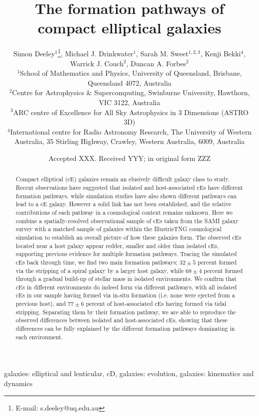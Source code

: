 \documentclass[a4paper,fleqn,usenatbib]{mnras}
\title[cE Formation]{The formation pathways of compact elliptical galaxies }
\author[S. Deeley et al.]{
Simon Deeley$^{1}$\thanks{E-mail: s.deeley@uq.edu.au},
Michael J. Drinkwater$^{1}$, Sarah M. Sweet$^{1,2,3}$, Kenji Bekki$^{4}$, Warrick J. Couch$^{2}$, \newauthor Duncan A. Forbes$^{2}$\\
${}^1$School of Mathematics and Physics, University of Queensland, Brisbane, Queensland 4072, Australia\\
${}^2$Centre for Astrophysics \& Supercomputing, Swinburne University, Hawthorn, VIC 3122, Australia \\
${}^3$ARC centre of Excellence for All Sky Astrophysics in 3 Dimensions (ASTRO 3D)\\
${}^4$International centre for Radio Astronomy Research, The University of Western Australia, 35 Stirling Highway, Crawley, Western Australia, 6009, Australia \\
}
\date{Accepted XXX. Received YYY; in original form ZZZ}
\begin{document}
\label{firstpage}
\pagerange{\pageref{firstpage}--\pageref{lastpage}}
\maketitle
\begin{abstract}

Compact elliptical (cE) galaxies remain an elusively difficult galaxy class to study. Recent observations have suggested that isolated and host-associated cEs have different formation pathways, while simulation studies have also shown different pathways can lead to a cE galaxy. However a solid link has not been established, and the relative contributions of each pathway in a cosmological context remains unknown. Here we combine a spatially-resolved observational sample of cEs taken from the SAMI galaxy survey with a matched sample of galaxies within the IllustrisTNG cosmological simulation to establish an overall picture of how these galaxies form. The observed cEs located near a host galaxy appear redder, smaller and older than isolated cEs, supporting previous evidence for multiple formation pathways. Tracing the simulated cEs back through time, we find two main formation pathways; $32\pm5$ percent formed via the stripping of a spiral galaxy by a larger host galaxy, while $68\pm4$ percent formed through a gradual build-up of stellar mass in isolated environments. We confirm that cEs in different environments do indeed form via different pathways, with all isolated cEs in our sample having formed via in-situ formation (i.e. none were ejected from a previous host), and $77\pm6$ percent of host-associated cEs having formed via tidal stripping. Separating them by their formation pathway, we are able to reproduce the observed differences between isolated and host-associated cEs, showing that these differences can be fully explained by the different formation pathways dominating in each environment. 

\end{abstract}

\begin{keywords}
galaxies: elliptical and lenticular, cD, galaxies: evolution, galaxies: kinematics and dynamics
\end{keywords}


\end{document}
